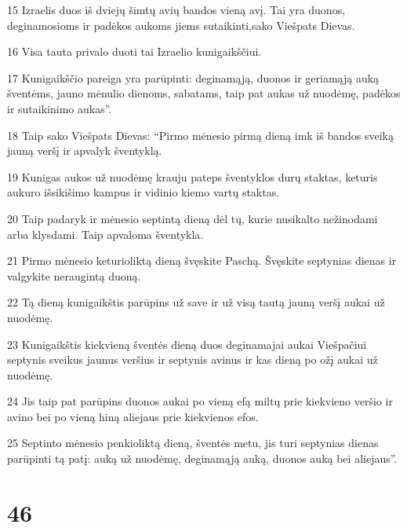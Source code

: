 \par 15 Izraelis duos iš dviejų šimtų avių bandos vieną avį. Tai yra duonos, deginamosioms ir padėkos aukoms jiems sutaikinti,­sako Viešpats Dievas.­ 
\par 16 Visa tauta privalo duoti tai Izraelio kunigaikščiui. 
\par 17 Kunigaikščio pareiga yra parūpinti: deginamąją, duonos ir geriamąją auką šventėms, jauno mėnulio dienoms, sabatams, taip pat aukas už nuodėmę, padėkos ir sutaikinimo aukas”. 
\par 18 Taip sako Viešpats Dievas: “Pirmo mėnesio pirmą dieną imk iš bandos sveiką jauną veršį ir apvalyk šventyklą. 
\par 19 Kunigas aukos už nuodėmę krauju pateps šventyklos durų staktas, keturis aukuro išsikišimo kampus ir vidinio kiemo vartų staktas. 
\par 20 Taip padaryk ir mėnesio septintą dieną dėl tų, kurie nusikalto nežinodami arba klysdami. Taip apvaloma šventykla. 
\par 21 Pirmo mėnesio keturioliktą dieną švęskite Paschą. Švęskite septynias dienas ir valgykite neraugintą duoną. 
\par 22 Tą dieną kunigaikštis parūpins už save ir už visą tautą jauną veršį aukai už nuodėmę. 
\par 23 Kunigaikštis kiekvieną šventės dieną duos deginamajai aukai Viešpačiui septynis sveikus jaunus veršius ir septynis avinus ir kas dieną po ožį aukai už nuodėmę. 
\par 24 Jis taip pat parūpins duonos aukai po vieną efą miltų prie kiekvieno veršio ir avino bei po vieną hiną aliejaus prie kiekvienos efos. 
\par 25 Septinto mėnesio penkioliktą dieną, šventės metu, jis turi septynias dienas parūpinti tą patį: auką už nuodėmę, deginamąją auką, duonos auką bei aliejaus”.



\chapter{46}


